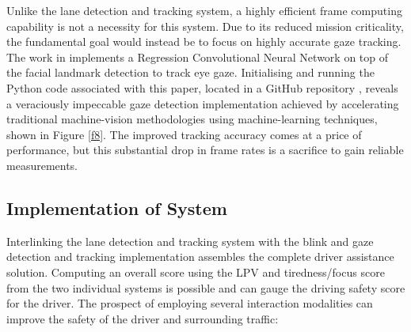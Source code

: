 \documentclass[9pt,conference]{IEEEtran}
\begin{document}
Unlike the lane detection and tracking system, a highly efficient frame computing capability is not a necessity for this system. Due to its reduced mission criticality, the fundamental goal would instead be to focus on highly accurate gaze tracking. The work in \cite{b17} implements a Regression Convolutional Neural Network on top of the facial landmark detection to track eye gaze. Initialising and running the Python code associated with this paper, located in a GitHub repository \cite{b18}, reveals a veraciously impeccable gaze detection implementation achieved by accelerating traditional machine-vision methodologies using machine-learning techniques, shown in Figure \ref{f8}. The improved tracking accuracy comes at a price of performance, but this substantial drop in frame rates is a sacrifice to gain reliable measurements.

\subsection{Implementation of System}

Interlinking the lane detection and tracking system with the blink and gaze detection and tracking implementation assembles the complete driver assistance solution. Computing an overall score using the LPV and tiredness/focus score from the two individual systems is possible and can gauge the driving safety score for the driver. The prospect of employing several interaction modalities can improve the safety of the driver and surrounding traffic:
\end{document}
